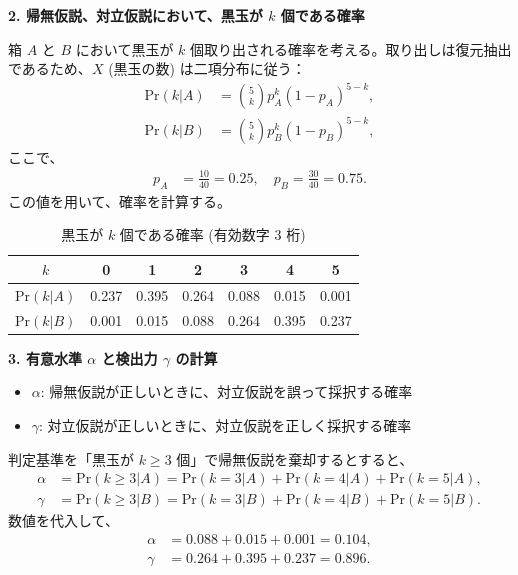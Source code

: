 \documentclass[10pt]{jsarticle}
\begin{document}
{\bf 2. 帰無仮説、対立仮説において、黒玉が \(k\) 個である確率}

箱 \(A\) と \(B\) において黒玉が \(k\) 個取り出される確率を考える。取り出しは復元抽出であるため、\(X\) (黒玉の数) は二項分布に従う：
\begin{align*}
    \text{Pr}(k|A) &= \binom{5}{k} p_A^k (1 - p_A)^{5-k}, \\
    \text{Pr}(k|B) &= \binom{5}{k} p_B^k (1 - p_B)^{5-k},
\end{align*}
ここで、
\begin{align*}
    p_A &= \frac{10}{40} = 0.25, \quad p_B = \frac{30}{40} = 0.75.
\end{align*}
この値を用いて、確率を計算する。

\begin{table}[h]
    \centering
    \begin{tabular}{|c|c|c|c|c|c|c|}
    \hline
    \(k\) & 0 & 1 & 2 & 3 & 4 & 5 \\
    \hline
    \(\text{Pr}(k|A)\) & 0.237 & 0.395 & 0.264 & 0.088 & 0.015 & 0.001 \\
    \hline
    \(\text{Pr}(k|B)\) & 0.001 & 0.015 & 0.088 & 0.264 & 0.395 & 0.237 \\
    \hline
    \end{tabular}
    \caption{黒玉が \(k\) 個である確率 (有効数字 3 桁)}
\end{table}

{\bf 3. 有意水準 \(\alpha\) と検出力 \(\gamma\) の計算}

\begin{itemize}
    \item \(\alpha\): 帰無仮説が正しいときに、対立仮説を誤って採択する確率
    \item \(\gamma\): 対立仮説が正しいときに、対立仮説を正しく採択する確率
\end{itemize}

判定基準を「黒玉が \(k \geq 3\) 個」で帰無仮説を棄却するとすると、
\begin{align*}
    \alpha &= \text{Pr}(k \geq 3 | A) = \text{Pr}(k = 3 | A) + \text{Pr}(k = 4 | A) + \text{Pr}(k = 5 | A), \\
    \gamma &= \text{Pr}(k \geq 3 | B) = \text{Pr}(k = 3 | B) + \text{Pr}(k = 4 | B) + \text{Pr}(k = 5 | B).
\end{align*}
数値を代入して、
\begin{align*}
    \alpha &= 0.088 + 0.015 + 0.001 = 0.104, \\
    \gamma &= 0.264 + 0.395 + 0.237 = 0.896.
\end{align*}
\end{document}
